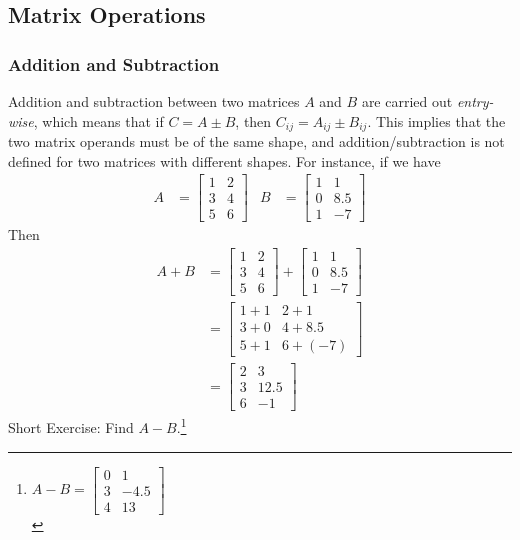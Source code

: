 \subsection{Matrix Operations} 
\subsubsection{Addition and Subtraction}
Addition and subtraction between two matrices $A$ and $B$ are carried out \textit{entry-wise}, which means that if $C = A \pm B$, then $C_{ij} = A_{ij} \pm B_{ij}$. This implies that the two matrix operands must be of the same shape, and addition/subtraction is not defined for two matrices with different shapes. For instance, if we have
\begin{align*}
A &=
\begin{bmatrix}
1 & 2 \\
3 & 4 \\
5 & 6
\end{bmatrix} &
B &= 
\begin{bmatrix}
1 & 1 \\
0 & 8.5 \\
1 & -7
\end{bmatrix}
\end{align*}
Then
\begin{align*}
A+B &= 
\begin{bmatrix}
1 & 2 \\
3 & 4 \\
5 & 6
\end{bmatrix}
+
\begin{bmatrix}
1 & 1 \\
0 & 8.5 \\
1 & -7
\end{bmatrix} \\
&= 
\begin{bmatrix}
1+1 & 2+1 \\
3+0 & 4+8.5 \\
5+1 & 6+(-7)
\end{bmatrix} \\
&= 
\begin{bmatrix}
2 & 3 \\
3 & 12.5 \\
6 & -1
\end{bmatrix}
\end{align*}
Short Exercise: Find $A-B$.\footnote{$A-B = \begin{bmatrix}
0 & 1 \\
3 & -4.5 \\
4 & 13
\end{bmatrix}$\\}

